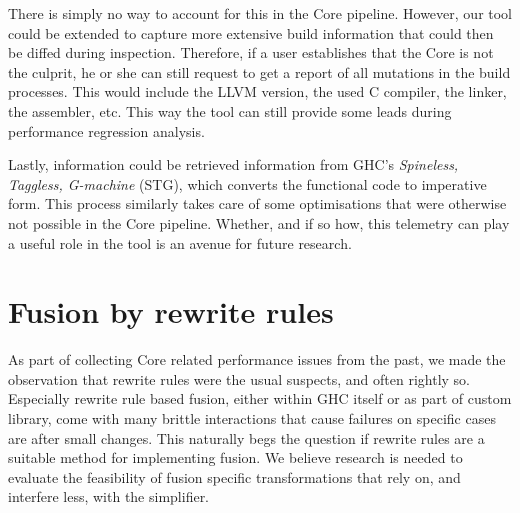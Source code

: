 There is simply no way to account for this in the Core pipeline. However, our tool could be extended to capture more extensive build information that
could then be diffed during inspection. Therefore, if a user establishes that the Core is not the culprit, he or she can still request to get a report of
all mutations in the build processes. This would include the LLVM version, the used C compiler, the linker, the assembler, etc. 
This way the tool can still provide some leads during performance regression analysis.

Lastly, information could be retrieved information from GHC's \textit{Spineless, Taggless, G-machine} (STG),
which converts the functional code to imperative form.
This process similarly takes care of some optimisations that were otherwise not possible in the Core pipeline.
Whether, and if so how, this telemetry can play a useful role in the tool is an avenue for future research.

\section{Fusion by rewrite rules}

As part of collecting Core related performance issues from the past, we made the observation that rewrite rules were the usual suspects, and often rightly so.
Especially rewrite rule based fusion, either within GHC itself or as part of custom library, come with many brittle interactions that cause failures
on specific cases are after small changes. This naturally begs the question if rewrite rules are a suitable method for implementing fusion. We believe
research is needed to evaluate the feasibility of fusion specific transformations that rely on, and interfere less, with the simplifier.
